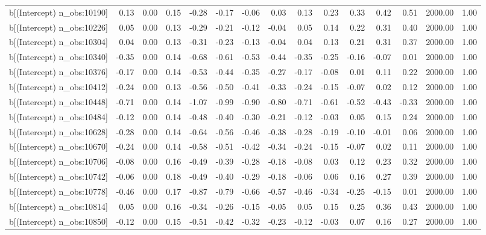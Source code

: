\begin{table}[ht]
\begin{tabular}{rrrrrrrrrrrrrrr}
  b[(Intercept) n\_obs:10190] & 0.13 & 0.00 & 0.15 & -0.28 & -0.17 & -0.06 & 0.03 & 0.13 & 0.23 & 0.33 & 0.42 & 0.51 & 2000.00 & 1.00 \\ 
  b[(Intercept) n\_obs:10226] & 0.05 & 0.00 & 0.13 & -0.29 & -0.21 & -0.12 & -0.04 & 0.05 & 0.14 & 0.22 & 0.31 & 0.40 & 2000.00 & 1.00 \\ 
  b[(Intercept) n\_obs:10304] & 0.04 & 0.00 & 0.13 & -0.31 & -0.23 & -0.13 & -0.04 & 0.04 & 0.13 & 0.21 & 0.31 & 0.37 & 2000.00 & 1.00 \\ 
  b[(Intercept) n\_obs:10340] & -0.35 & 0.00 & 0.14 & -0.68 & -0.61 & -0.53 & -0.44 & -0.35 & -0.25 & -0.16 & -0.07 & 0.01 & 2000.00 & 1.00 \\ 
  b[(Intercept) n\_obs:10376] & -0.17 & 0.00 & 0.14 & -0.53 & -0.44 & -0.35 & -0.27 & -0.17 & -0.08 & 0.01 & 0.11 & 0.22 & 2000.00 & 1.00 \\ 
  b[(Intercept) n\_obs:10412] & -0.24 & 0.00 & 0.13 & -0.56 & -0.50 & -0.41 & -0.33 & -0.24 & -0.15 & -0.07 & 0.02 & 0.12 & 2000.00 & 1.00 \\ 
  b[(Intercept) n\_obs:10448] & -0.71 & 0.00 & 0.14 & -1.07 & -0.99 & -0.90 & -0.80 & -0.71 & -0.61 & -0.52 & -0.43 & -0.33 & 2000.00 & 1.00 \\ 
  b[(Intercept) n\_obs:10484] & -0.12 & 0.00 & 0.14 & -0.48 & -0.40 & -0.30 & -0.21 & -0.12 & -0.03 & 0.05 & 0.15 & 0.24 & 2000.00 & 1.00 \\ 
  b[(Intercept) n\_obs:10628] & -0.28 & 0.00 & 0.14 & -0.64 & -0.56 & -0.46 & -0.38 & -0.28 & -0.19 & -0.10 & -0.01 & 0.06 & 2000.00 & 1.00 \\ 
  b[(Intercept) n\_obs:10670] & -0.24 & 0.00 & 0.14 & -0.58 & -0.51 & -0.42 & -0.34 & -0.24 & -0.15 & -0.07 & 0.02 & 0.11 & 2000.00 & 1.00 \\ 
  b[(Intercept) n\_obs:10706] & -0.08 & 0.00 & 0.16 & -0.49 & -0.39 & -0.28 & -0.18 & -0.08 & 0.03 & 0.12 & 0.23 & 0.32 & 2000.00 & 1.00 \\ 
  b[(Intercept) n\_obs:10742] & -0.06 & 0.00 & 0.18 & -0.49 & -0.40 & -0.29 & -0.18 & -0.06 & 0.06 & 0.16 & 0.27 & 0.39 & 2000.00 & 1.00 \\ 
  b[(Intercept) n\_obs:10778] & -0.46 & 0.00 & 0.17 & -0.87 & -0.79 & -0.66 & -0.57 & -0.46 & -0.34 & -0.25 & -0.15 & 0.01 & 2000.00 & 1.00 \\ 
  b[(Intercept) n\_obs:10814] & 0.05 & 0.00 & 0.16 & -0.34 & -0.26 & -0.15 & -0.05 & 0.05 & 0.15 & 0.25 & 0.36 & 0.43 & 2000.00 & 1.00 \\ 
  b[(Intercept) n\_obs:10850] & -0.12 & 0.00 & 0.15 & -0.51 & -0.42 & -0.32 & -0.23 & -0.12 & -0.03 & 0.07 & 0.16 & 0.27 & 2000.00 & 1.00 \\ 

\end{tabular}
\end{table}
